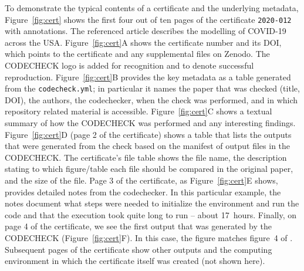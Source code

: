 \documentclass[12pt]{article}
\begin{document}
To demonstrate the typical contents of a certificate and the underlying
metadata, 
Figure~\ref{fig:cert} shows the first four out of ten
pages of the certificate \texttt{2020-012} \cite{cert-2020-012} with
annotations.
The referenced article \cite{unwin_report_2020} describes the modelling of COVID-19 across the USA.
Figure~\ref{fig:cert}A shows the certificate number and its DOI,
which points to the certificate and any supplemental files on Zenodo.
The CODECHECK logo is
added for recognition and to denote successful reproduction.
Figure~\ref{fig:cert}B provides the key metadata as a table generated
from the \texttt{codecheck.yml}; in particular it names the paper that
was checked (title, DOI), the authors, the codechecker, when the check was performed,
and in which repository related material is
accessible.
Figure~\ref{fig:cert}C shows a textual summary of how the CODECHECK was
performed and any interesting findings.
Figure~\ref{fig:cert}D (page 2 of the certificate) shows a table that
lists the outputs that were generated from the check based on the 
manifest of output files in the CODECHECK.
The certificate's file table shows the file name, the description stating to
which figure/table each file should be compared in the original paper, and
the size of the file.
Page 3 of the certificate,
as Figure~\ref{fig:cert}E shows, provides detailed notes from the
codechecker. In this particular example, the notes document what steps were 
needed to initialize the environment and run the code and that the execution
took quite long to run -- about 17~hours. Finally, on page 4 of
the certificate, we see the first output that was generated by the
CODECHECK (Figure~\ref{fig:cert}F). In this case, the figure matches
figure~4 of \cite{unwin_report_2020}.
Subsequent pages of the certificate show other outputs and the computing
environment in which the certificate itself was created (not shown here).
\end{document}
